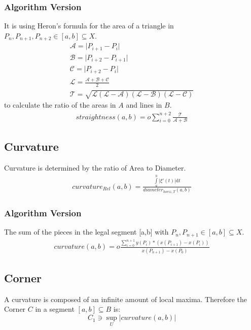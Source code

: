 \documentclass{report}
\newcommand\norm[1]{\left\lVert#1\right\rVert}
\begin{document}
\subsubsection{Algorithm Version}
It is using Heron's formula for the area of a triangle in $P_{n}, P_{n+1},P_{n+2} \in [a,b] \subseteq X$.
\begin{align*}
\mathcal{A}=\lvert P_{i+1}-P_{i} \rvert\\
\mathcal{B}=\lvert P_{i+2} - P_{i+1} \rvert\\
\mathcal{C}=\lvert P_{i+2} - P_{i} \rvert\\
\mathcal{L}=\frac{\mathcal{A}+\mathcal{B}+\mathcal{C}}{2}\\
\mathcal{T}=\sqrt{\mathcal{L}(\mathcal{L}-\mathcal{A})(\mathcal{L}-\mathcal{B})(\mathcal{L}-\mathcal{C})}
\end{align*}
to calculate the ratio of the areas in $A$ and lines in $B$.
\begin{align}
straightness(a,b)=o \sum_{i=0}^{n+2}\frac{\mathcal{T}}{\mathcal{A}+\mathcal{B}}
\end{align}

\subsection{Curvature}
\iffalse
Because the diameter has to be calculated piece-wise, we have to set up a vector space with the turns $P_{n},P_{n+1} \in T$.
\begin{equation}
v \in (B,\norm{\cdot})
\end{equation}
Note: It is a Banach space.\\
\fi
Curvature is determined by the ratio of Area to Diameter.
\begin{align}
curvature_{Rel}(a,b) = \frac{\int \limits _{a}^{b} \lvert \xi'(t) \rvert \mathrm{d}t}{diameter_{horiz,T}(a,b)}
\end{align}
\subsubsection{Algorithm Version}
The sum of the pieces in the legal segment [a,b] with $P_{n}, P_{n+1} \in [a,b] \subseteq X$.
\begin{align}
curvature(a,b)= o \frac{\sum \limits _{i=0}^{n+1}y(P_{i})*(x(P_{i+1})-x(P_{i}))}{x(P_{n+1})-x(P_{0})}
\end{align}

\subsection{Corner}
A curvature is composed of an infinite amount of local maxima. Therefore the Corner $C$ in a segment $[a,b] \subseteq B$ is:
\begin{equation}
C_{1} \ni \sup_{U}\lvert curvature(a,b) \rvert
\end{equation}
\end{document}
